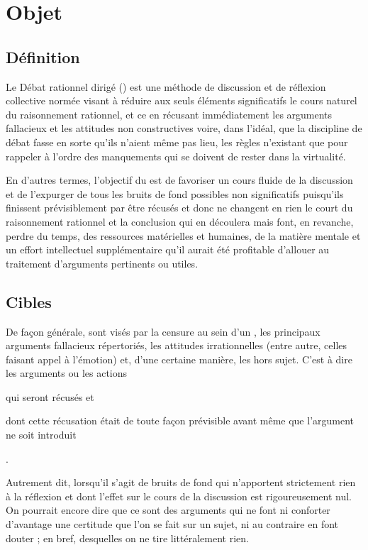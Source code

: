 \section{Objet}

\subsection{Définition}
Le Débat rationnel dirigé (\mainabbr{}) est une méthode de discussion et de réflexion collective normée visant à réduire aux seuls éléments significatifs le cours naturel du raisonnement rationnel, et ce en récusant immédiatement les arguments fallacieux et les attitudes non constructives voire, dans l’idéal, que la discipline de débat fasse en sorte qu’ils n’aient même pas lieu, les règles n’existant que pour rappeler à l’ordre des manquements qui se doivent de rester dans la virtualité.

En d’autres termes, l’objectif du \mainabbr{} est de favoriser un cours fluide de la discussion et de l’expurger de tous les bruits de fond possibles non significatifs puisqu’ils finissent prévisiblement par être récusés et donc ne changent en rien le court du raisonnement rationnel et la conclusion qui en découlera mais font, en revanche, perdre du temps, des ressources matérielles et humaines, de la matière mentale et un effort intellectuel supplémentaire qu’il aurait été profitable d’allouer au traitement d’arguments pertinents ou utiles.

\subsection{Cibles}
De façon générale, sont visés par la censure au sein d’un \mainabbr{}, les principaux arguments fallacieux répertoriés, les attitudes irrationnelles (entre autre, celles faisant appel à l’émotion) et, d’une certaine manière, les hors sujet. C’est à dire les arguments ou les actions
\begin{SRlist}
	\item qui seront récusés
	et
	\item dont cette récusation était de toute façon prévisible avant même que l’argument ne soit introduit%
\end{SRlist}%
.

Autrement dit, lorsqu’il s’agit de bruits de fond qui n’apportent strictement rien à la réflexion et dont l’effet sur le cours de la discussion est rigoureusement nul. On pourrait encore dire que ce sont des arguments qui ne font ni conforter d’avantage une certitude que l’on se fait sur un sujet, ni au contraire en font douter ; en bref, desquelles on ne tire littéralement rien.

